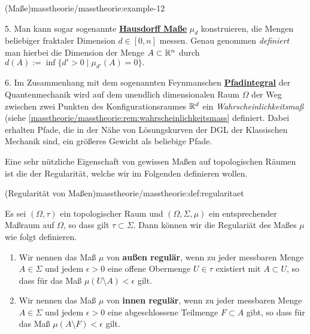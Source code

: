 \begin{example}{(Maße)}{masstheorie/masstheorie:example-12}
\par
5. Man kann sogar sogenannte \href{https://de.wikipedia.org/wiki/Hausdorff-Ma\%c3\%9f}{\textbf{Hausdorff Maße}} \(\mu_d\) konstruieren, die Mengen beliebiger fraktaler Dimension \(d\in[0,n]\) messen.
Genau genommen \emph{definiert} man hierbei die Dimension der Menge \(A\subset \mathbb{R}^n\) durch \(d(A):=\inf\{d'>0\mid \mu_{d'}(A)=0\}.\)

\par
6. Im Zusammenhang mit dem sogenannten Feynmanschen \href{https://de.wikipedia.org/wiki/Pfadintegral}{\textbf{Pfadintegral}} der Quantenmechanik wird auf dem unendlich dimensionalen Raum \(\Omega\) der Weg zwischen zwei Punkten des Konfigurationsraumes \(\mathbb{R}^d\) ein \emph{Wahrscheinlichkeitsmaß} (siehe \cref{masstheorie/masstheorie:rem:wahrscheinlichkeitsmass}  definiert.
Dabei erhalten Pfade, die in der Nähe von Lösungskurven der DGL der Klassischen Mechanik sind, ein größeres Gewicht als beliebige Pfade.
\end{example}

\par
Eine sehr nützliche Eigenschaft von gewissen Maßen auf topologischen Räumen ist die der Regularität, welche wir im Folgenden definieren wollen.
\begin{definition}{(Regularität von Maßen)}{masstheorie/masstheorie:def:regularitaet}



\par
Es sei \((\Omega, \tau)\) ein topologischer Raum und \((\Omega, \Sigma, \mu)\) ein entsprechender Maßraum auf \(\Omega\), so dass gilt \(\tau \subset \Sigma\).
Dann können wir die Regulariät des Maßes \(\mu\) wie folgt definieren.
\begin{enumerate}

\item {} 
\par
Wir nennen das Maß \(\mu\) von \textbf{außen regulär}, wenn zu jeder messbaren Menge \(A \in \Sigma\) und jedem \(\epsilon > 0\) eine offene Obermenge \(U \in \tau\) existiert mit \(A \subset U\), so dass für das Maß \(\mu(U\setminus A) < \epsilon\) gilt.

\item {} 
\par
Wir nennen das Maß \(\mu\) von \textbf{innen regulär}, wenn zu jeder messbaren Menge \(A \in \Sigma\) und jedem \(\epsilon > 0\) eine abgeschlossene Teilmenge \(F \subset A\) gibt, so dass für das Maß \(\mu(A\setminus F) < \epsilon\) gilt.

\end{enumerate}
\end{definition}



